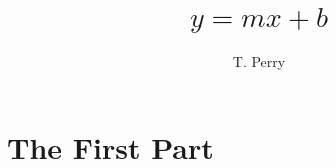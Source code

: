 \documentclass[oneside,11pt]{memoir} %
\title{$y=mx+b$} %
\author{T. Perry} %
\begin{document}


\newpage %


%








\part{The First Part}









\end{document}
